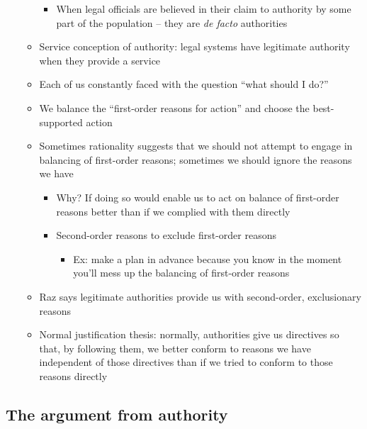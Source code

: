 \begin{itemize}
\begin{itemize}
    \begin{itemize}
    \tightlist
    \item
      When legal officials are believed in their claim to authority by
      some part of the population -- they are \emph{de facto}
      authorities
    \end{itemize}
  \item
    Service conception of authority: legal systems have legitimate
    authority when they provide a service
  \item
    Each of us constantly faced with the question ``what should I do?''
  \item
    We balance the ``first-order reasons for action'' and choose the
    best-supported action
  \item
    Sometimes rationality suggests that we should not attempt to engage
    in balancing of first-order reasons; sometimes we should ignore the
    reasons we have

    \begin{itemize}
    \tightlist
    \item
      Why? If doing so would enable us to act on balance of first-order
      reasons better than if we complied with them directly
    \item
      Second-order reasons to exclude first-order reasons

      \begin{itemize}
      \tightlist
      \item
        Ex: make a plan in advance because you know in the moment you'll
        mess up the balancing of first-order reasons
      \end{itemize}
    \end{itemize}
  \item
    Raz says legitimate authorities provide us with second-order,
    exclusionary reasons
  \item
    Normal justification thesis: normally, authorities give us
    directives so that, by following them, we better conform to reasons
    we have independent of those directives than if we tried to conform
    to those reasons directly
  \end{itemize}
\end{itemize}

\hypertarget{the-argument-from-authority}{%
\subsection{The argument from
authority}\label{the-argument-from-authority}}

